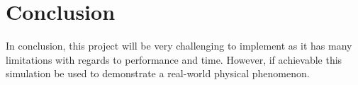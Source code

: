 \documentclass[conference,backref=page]{acmsiggraph}
\begin{document}
\section{Conclusion}

In conclusion, this project will be very challenging to implement as it has many limitations with regards to performance and time. However, if achievable this simulation be used to demonstrate a real-world physical phenomenon. 





\end{document}
